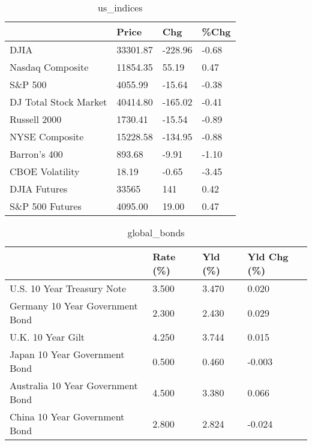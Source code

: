 \documentclass{article}%
\begin{document}
%


\begin{table}[htbp]%
\caption{us\_indices}%
\centering%
\begin{adjustbox}{width=1\textwidth}%
\begin{tabular}{llll}
\toprule
                      &    Price &     Chg &  \%Chg \\
\midrule
                 DJIA & 33301.87 & -228.96 & -0.68 \\
     Nasdaq Composite & 11854.35 &   55.19 &  0.47 \\
              S\&P 500 &  4055.99 &  -15.64 & -0.38 \\
DJ Total Stock Market & 40414.80 & -165.02 & -0.41 \\
         Russell 2000 &  1730.41 &  -15.54 & -0.89 \\
       NYSE Composite & 15228.58 & -134.95 & -0.88 \\
         Barron's 400 &   893.68 &   -9.91 & -1.10 \\
      CBOE Volatility &    18.19 &   -0.65 & -3.45 \\
         DJIA Futures &    33565 &     141 &  0.42 \\
      S\&P 500 Futures &  4095.00 &   19.00 &  0.47 \\
\bottomrule
\end{tabular}
%
\end{adjustbox}%
\end{table}

%


\begin{table}[htbp]%
\caption{global\_bonds}%
\centering%
\begin{adjustbox}{width=1\textwidth}%
\begin{tabular}{llll}
\toprule
                                  & Rate (\%) & Yld (\%) & Yld Chg (\%) \\
\midrule
       U.S. 10 Year Treasury Note &    3.500 &   3.470 &       0.020 \\
  Germany 10 Year Government Bond &    2.300 &   2.430 &       0.029 \\
                U.K. 10 Year Gilt &    4.250 &   3.744 &       0.015 \\
    Japan 10 Year Government Bond &    0.500 &   0.460 &      -0.003 \\
Australia 10 Year Government Bond &    4.500 &   3.380 &       0.066 \\
    China 10 Year Government Bond &    2.800 &   2.824 &      -0.024 \\
\bottomrule
\end{tabular}
%
\end{adjustbox}%
\end{table}
\end{document}
